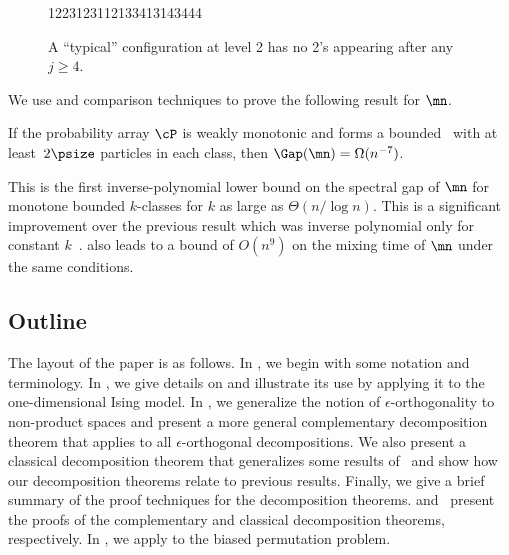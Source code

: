 \begin{figure}[]
  \centering
           \newcommand{\one}{{\color{gray}1}}
         {\color{red} \one 223\one 23\one \one 2\one 334\one 3\one 43444}\\
      \caption{A ``typical'' configuration at level 2 has no 2's appearing after any $j\geq 4$.}
\label{fig:typical}
\end{figure}

We use  and comparison techniques to prove the following result for $\mn$.

\newtheorem*{mnGap}{}
\begin{theorem}\label{thm:mnGap} If the
%
probability array $\cP$ is  %
weakly monotonic and
%
forms  %
a bounded \kP\, with at least~$2\psize$ particles 
 in each class, then $\Gap(\mn)=\Omega(n^{-7})$.
\end{theorem}
 
\noindent This is the first inverse-polynomial %
lower   %
bound on the spectral 
gap of $\mn$ for monotone bounded $k$-classes for $k$ as large as 
$\Theta(n/\log n)$.  This is a significant improvement over the 
previous result which was inverse polynomial only for constant 
$k$~\cite{MR00}.   also leads to a bound of 
$O(n^9)$ on the mixing time of $\mn$ under the same conditions.

\subsection{Outline}

The layout of the paper is as follows.  In , we 
begin with some notation and terminology.  In 
, we give details on 
 and illustrate its use by applying it 
to the one-dimensional Ising model. In 
, we generalize the notion of 
$\epsilon$-orthogonality to non-product spaces and present a more 
general complementary decomposition theorem that applies to all 
$\epsilon$-orthogonal decompositions. We also present a classical 
decomposition theorem that generalizes some results of~\cite{jstv04} 
and show how our decomposition theorems relate to previous results. 
Finally, we give a brief summary of the proof techniques for the 
decomposition theorems.   
and~ present the proofs of the complementary and 
classical decomposition theorems, respectively. In 
, we apply  to the 
biased permutation problem. 



